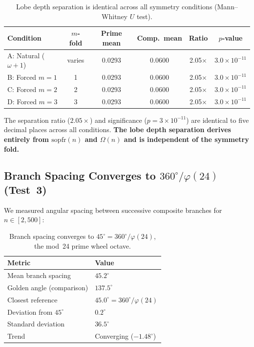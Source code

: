 \documentclass[11pt,a4paper]{article}
\begin{document}
\begin{table}[H]
\centering
\begin{tabular}{lccccc}
\toprule
\textbf{Condition} & \textbf{$m$-fold} & \textbf{Prime mean} & \textbf{Comp.\ mean} & \textbf{Ratio} & \textbf{$p$-value} \\
\midrule
A: Natural ($\omega+1$) & varies & 0.0293 & 0.0600 & 2.05$\times$ & $3.0\times10^{-11}$ \\
B: Forced $m=1$ & 1 & 0.0293 & 0.0600 & 2.05$\times$ & $3.0\times10^{-11}$ \\
C: Forced $m=2$ & 2 & 0.0293 & 0.0600 & 2.05$\times$ & $3.0\times10^{-11}$ \\
D: Forced $m=3$ & 3 & 0.0293 & 0.0600 & 2.05$\times$ & $3.0\times10^{-11}$ \\
\bottomrule
\end{tabular}
\caption{Lobe depth separation is identical across all symmetry conditions (Mann--Whitney $U$ test).}
\label{tab:lobes}
\end{table}

The separation ratio ($2.05\times$) and significance ($p = 3\times10^{-11}$) are identical to five decimal places across all conditions. \textbf{The lobe depth separation derives entirely from $\mathrm{sopfr}(n)$ and $\Omega(n)$ and is independent of the symmetry fold.}

\subsection{Branch Spacing Converges to $360^\circ/\varphi(24)$ (Test~3)}

We measured angular spacing between successive composite branches for $n \in [2, 500]$:

\begin{table}[H]
\centering
\begin{tabular}{ll}
\toprule
\textbf{Metric} & \textbf{Value} \\
\midrule
Mean branch spacing & $45.2^\circ$ \\
Golden angle (comparison) & $137.5^\circ$ \\
Closest reference & $45.0^\circ = 360^\circ/\varphi(24)$ \\
Deviation from $45^\circ$ & $0.2^\circ$ \\
Standard deviation & $36.5^\circ$ \\
Trend & Converging ($-1.48^\circ$) \\
\bottomrule
\end{tabular}
\caption{Branch spacing converges to $45^\circ = 360^\circ/\varphi(24)$, the mod~24 prime wheel octave.}
\label{tab:golden}
\end{table}
\end{document}
